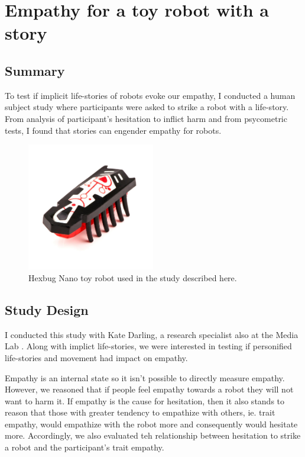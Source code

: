 \chapter{Empathy for a toy robot with a story}
\label{chap_hexbug}

\section{Summary}

To test if implicit life-stories of robots evoke our empathy, I conducted a human subject study where participants were asked to strike a robot with a life-story. From analysis of participant's hesitation to inflict harm and from psycometric tests, I found that stories can engender empathy for robots.



   \begin{figure}[thpb]
      \centering
      \includegraphics[width=2.2in]{figures/hexbug/hexbug_nano.jpg}
      \caption{Hexbug Nano toy robot used in the study described here.}
      \label{fig_hexbug_hexbug_nano}
   \end{figure}


\section{Study Design}

I conducted this study with Kate Darling, a research specialist also at the Media Lab \cite{darling_hexbug_study}. Along with implict life-stories, we were interested in testing if personified life-stories and movement had impact on empathy. 

Empathy is an internal state so it isn't possible to directly measure empathy.
However, we reasoned that if people feel empathy towards a robot they will not want to harm it. If empathy is the cause for hesitation, then it also stands to reason that those with greater tendency to empathize with others, ie. trait empathy, would empathize with the robot more and consequently would hesitate more. Accordingly, we also evaluated teh relationship between hesitation to strike a robot and the participant's trait empathy.


